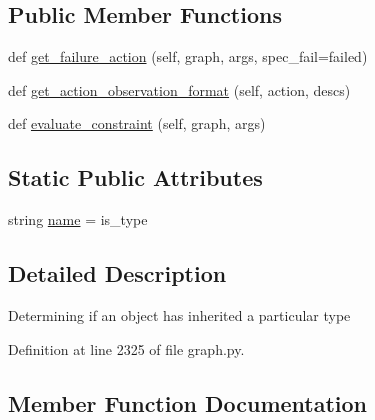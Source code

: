 \subsection*{Public Member Functions}
\begin{DoxyCompactItemize}
\item 
def \hyperlink{classlight__chats_1_1graph_1_1IsTypeConstraint_a0d16b081fd2f7d73ed7e0414cd518f1e}{get\+\_\+failure\+\_\+action} (self, graph, args, spec\+\_\+fail=\textquotesingle{}failed\textquotesingle{})
\item 
def \hyperlink{classlight__chats_1_1graph_1_1IsTypeConstraint_a1443cca8a343b530929093446b1b914f}{get\+\_\+action\+\_\+observation\+\_\+format} (self, action, descs)
\item 
def \hyperlink{classlight__chats_1_1graph_1_1IsTypeConstraint_aad886d877405c19204a37f2f7cf34db9}{evaluate\+\_\+constraint} (self, graph, args)
\end{DoxyCompactItemize}
\subsection*{Static Public Attributes}
\begin{DoxyCompactItemize}
\item 
string \hyperlink{classlight__chats_1_1graph_1_1IsTypeConstraint_a16c20673b33e67aea11487a9bb8b3b24}{name} = \textquotesingle{}is\+\_\+type\textquotesingle{}
\end{DoxyCompactItemize}


\subsection{Detailed Description}
\begin{DoxyVerb}Determining if an object has inherited a particular type\end{DoxyVerb}
 

Definition at line 2325 of file graph.\+py.



\subsection{Member Function Documentation}
\mbox{\label{classlight__chats_1_1graph_1_1IsTypeConstraint_aad886d877405c19204a37f2f7cf34db9}} 
